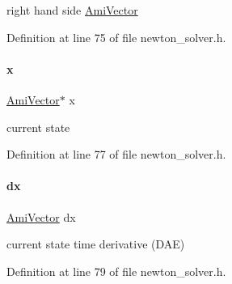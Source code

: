 right hand side \mbox{\hyperlink{classamici_1_1_ami_vector}{Ami\+Vector}} 

Definition at line 75 of file newton\+\_\+solver.\+h.

\mbox{\label{classamici_1_1_newton_solver_af64268982dd7b9be1690573763982e0b}} 
\paragraph{\texorpdfstring{x}{x}}
{\footnotesize\ttfamily \mbox{\hyperlink{classamici_1_1_ami_vector}{Ami\+Vector}}$\ast$ x\hspace{0.3cm}{\ttfamily [protected]}}

current state 

Definition at line 77 of file newton\+\_\+solver.\+h.

\mbox{\label{classamici_1_1_newton_solver_a17e4770df418fc1f2c4283d7e188d81d}} 
\paragraph{\texorpdfstring{dx}{dx}}
{\footnotesize\ttfamily \mbox{\hyperlink{classamici_1_1_ami_vector}{Ami\+Vector}} dx\hspace{0.3cm}{\ttfamily [protected]}}

current state time derivative (D\+AE) 

Definition at line 79 of file newton\+\_\+solver.\+h.

